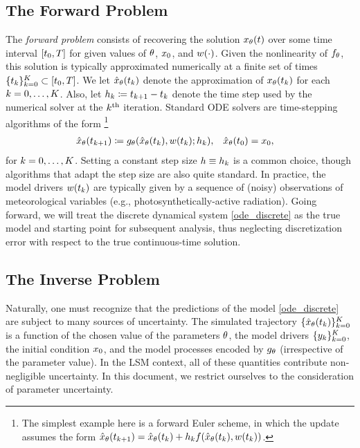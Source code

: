\documentclass[12pt]{article}
\begin{document}
\subsection{The Forward Problem}
The \textit{forward problem} consists of recovering the solution $\state_{\Par}(\Time)$ over some time interval $[\timeInitState, \timeEnd]$ for given 
values of $\Par$, $\stateInit$, and $\forcing(\cdot)$. Given the nonlinearity of $\funcODE_{\Par}$, this solution is typically approximated 
numerically at a finite set of times $\{\indexTime{\Time}\}_{\timeIdx=\firstTimeIdxState}^{\lastTimeIdx} \subset [\timeInitState, \timeEnd]$. We 
let $\stateApprox_{\Par}(\indexTime{\Time})$ denote the approximation of $\state_{\Par}(\indexTime{\Time})$ for each 
$\timeIdx = \firstTimeIdxState, \dots, \lastTimeIdx$. Also, let $\indexTime{\timeStep} \Def \indexTime[\timeIdx+1]{\Time} - \indexTime{\Time}$ denote the 
time step used by the numerical solver at the $\timeIdx^{\text{th}}$ iteration. Standard ODE solvers are time-stepping algorithms of the 
form 
\footnote{The simplest example here is a forward Euler scheme, in which the update assumes the form 
$\stateApprox_{\Par}(\indexTime[\timeIdx+1]{\Time})
= \stateApprox_{\Par}(\indexTime{\Time}) + \indexTime{\timeStep} \funcODE(\stateApprox_{\Par}(\indexTime{\Time}), \forcing(\indexTime{\Time}))$.}
\begin{align}
&\stateApprox_{\Par}(\indexTime[\timeIdx+1]{\Time}) \Def \fwdOne_{\Par}(\stateApprox_{\Par}(\indexTime{\Time}), \forcing(\indexTime{\Time}); \indexTime{\timeStep}), 
&&\stateApprox_{\Par}(\indexTime[\firstTimeIdxState]{\Time}) = \stateInit, \label{ode_discrete}
\end{align}
for $\timeIdx = \firstTimeIdxState, \dots, \lastTimeIdx$. Setting a constant step size $\timeStep \equiv \indexTime{\timeStep}$ is a common choice, though 
algorithms that adapt the step size are also quite standard. In practice, the model drivers $\forcing(\indexTime{\Time})$
are typically given by a sequence of (noisy) observations of meteorological variables (e.g., photosynthetically-active radiation).
Going forward, we will treat the discrete dynamical system \ref{ode_discrete} as 
the true model and starting point for subsequent analysis, thus neglecting discretization error with respect to the true continuous-time solution.


\subsection{The Inverse Problem}
Naturally, one must recognize that the predictions of the model \ref{ode_discrete} are subject to many sources of uncertainty. 
The simulated trajectory $\{\stateApprox_{\Par}(\indexTime{\Time})\}_{\timeIdx=\firstTimeIdxState}^{\lastTimeIdx}$ is a function of  
the chosen value of the parameters $\Par$, the model drivers  $\{\indexTime{\obs}\}_{\timeIdx=\firstTimeIdxState}^{\lastTimeIdx}$, the initial condition $\stateInit$, 
and the model processes encoded by $\fwdOne_{\Par}$ (irrespective of the parameter value). In the LSM context, 
all of these quantities contribute non-negligible uncertainty. 
In this document, we restrict ourselves to the consideration of parameter uncertainty. 
\end{document}
